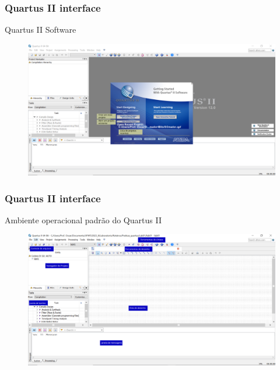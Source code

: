 \documentclass{CPSPresentation}
\begin{document}
\begin{frame}
	\frametitle{Quartus II interface}
	
	
	\begin{block}{}
		\justifying
		Quartus II Software
	\end{block}
	
	
	
	
	\begin{figure}[h]
		\centering
		\includegraphics[width=1.02\textwidth]{quartus/fig03.pdf}
	\end{figure}
	
	
\end{frame}
\begin{frame}
	\frametitle{Quartus II interface}
	
	\begin{block}{}
		\justifying
		Ambiente operacional padrão do Quartus II
	\end{block}
	
	\begin{figure}[h]
		\centering
		\includegraphics[width=1.02\textwidth]{quartus/fig04.pdf}
	\end{figure}
	
	
\end{frame}
\end{document}
